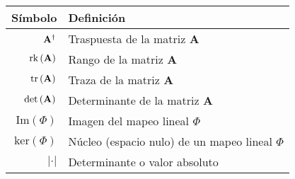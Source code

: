 \begin{table}[H]
    \begin{center}
        \begin{tabularx}{\textwidth}{|r|X|}
            \hline
            \textbf{Símbolo}                                                                                                     & \textbf{Definición}                                                                         \\
            \hline
            $ \mathit{\mathbf{{A}}}^{\dagger} $                                                                                         & Traspuesta de la matriz $\mathbf{A}$                                                        \\
            $ \text{rk}\left(\mathit{\mathbf{{A}}}\right) $                                                                             & Rango de la matriz $\mathbf{A}$                                                             \\
            $ \text{tr}\left(\mathit{\mathbf{{A}}}\right) $                                                                             & Traza de la matriz $\mathbf{A}$                                                             \\
            $ \text{det}\left(\mathit{\mathbf{{A}}}\right) $                                                                            & Determinante de la matriz $\mathbf{A}$                                                      \\
            $ \text{Im}\left(\Phi\right) $                                                                                       & Imagen del mapeo lineal $\Phi$                                                              \\
            $ \text{ker}\left(\Phi\right) $                                                                                      & Núcleo (espacio nulo) de un mapeo lineal $\Phi$                                             \\
            \hline
            $ {\lvert \cdot \rvert} $                                                                                            & Determinante o valor absoluto                                                               \\

\end{tabularx}
\end{center}
\end{table}
